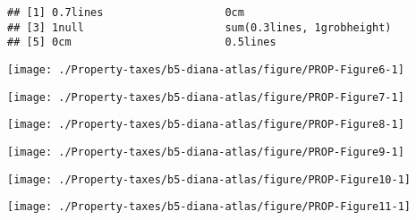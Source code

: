 \documentclass[tikz]{standalone}\usepackage[]{graphicx}\usepackage[]{color}
\makeatletter
\newenvironment{kframe}{%
 \def\at@end@of@kframe{}%
 \ifinner\ifhmode%
  \def\at@end@of@kframe{\end{minipage}}%
  \begin{minipage}{\columnwidth}%
 \fi\fi%
 \def\FrameCommand##1{\hskip\@totalleftmargin \hskip-\fboxsep
 \colorbox{shadecolor}{##1}\hskip-\fboxsep
     \hskip-\linewidth \hskip-\@totalleftmargin \hskip\columnwidth}%
 \MakeFramed {\advance\hsize-\width
   \@totalleftmargin\z@ \linewidth\hsize
   \@setminipage}}%
 {\par\unskip\endMakeFramed%
 \at@end@of@kframe}
\newenvironment{knitrout}{}{} %
\makeatother
\begin{document}
\begin{knitrout}
\color{fgcolor}\begin{kframe}
\begin{verbatim}
## [1] 0.7lines                   0cm                       
## [3] 1null                      sum(0.3lines, 1grobheight)
## [5] 0cm                        0.5lines
\end{verbatim}
\end{kframe}
\end{knitrout}
\clearpage
\begin{knitrout}
\color{fgcolor}
\texttt{[image: ./Property-taxes/b5-diana-atlas/figure/PROP-Figure6-1]} 

\end{knitrout}

\clearpage
\begin{knitrout}
\color{fgcolor}
\texttt{[image: ./Property-taxes/b5-diana-atlas/figure/PROP-Figure7-1]} 

\end{knitrout}

\clearpage
\begin{knitrout}
\color{fgcolor}
\texttt{[image: ./Property-taxes/b5-diana-atlas/figure/PROP-Figure8-1]} 

\end{knitrout}

\begin{knitrout}
\color{fgcolor}
\texttt{[image: ./Property-taxes/b5-diana-atlas/figure/PROP-Figure9-1]} 

\end{knitrout}

\begin{knitrout}
\color{fgcolor}
\texttt{[image: ./Property-taxes/b5-diana-atlas/figure/PROP-Figure10-1]} 

\end{knitrout}

\begin{knitrout}
\color{fgcolor}
\texttt{[image: ./Property-taxes/b5-diana-atlas/figure/PROP-Figure11-1]} 

\end{knitrout}
\end{document}
